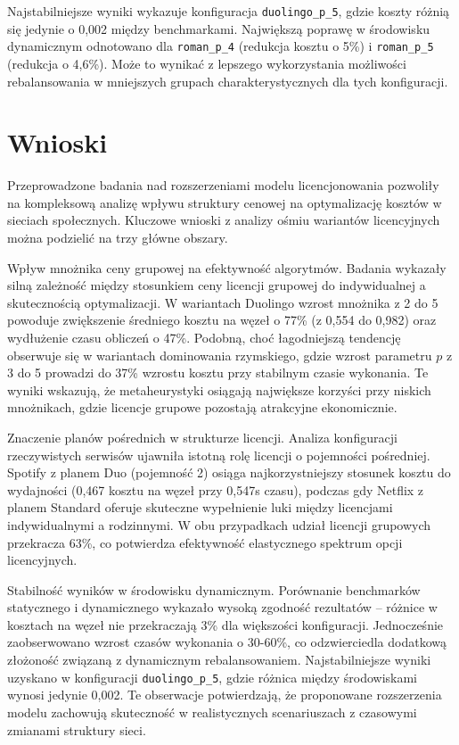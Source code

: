 Najstabilniejsze wyniki wykazuje konfiguracja \texttt{duolingo\_p\_5}, gdzie koszty różnią się jedynie o 0,002 między benchmarkami. Największą poprawę w środowisku dynamicznym odnotowano dla \texttt{roman\_p\_4} (redukcja kosztu o 5\%) i \texttt{roman\_p\_5} (redukcja o 4,6\%). Może to wynikać z lepszego wykorzystania możliwości rebalansowania w mniejszych grupach charakterystycznych dla tych konfiguracji.
\section{Wnioski}

Przeprowadzone badania nad rozszerzeniami modelu licencjonowania pozwoliły na kompleksową analizę wpływu struktury cenowej na optymalizację kosztów w sieciach społecznych. Kluczowe wnioski z analizy ośmiu wariantów licencyjnych można podzielić na trzy główne obszary.

Wpływ mnożnika ceny grupowej na efektywność algorytmów. Badania wykazały silną zależność między stosunkiem ceny licencji grupowej do indywidualnej a skutecznością optymalizacji. W wariantach Duolingo wzrost mnożnika z 2 do 5 powoduje zwiększenie średniego kosztu na węzeł o 77\% (z 0,554 do 0,982) oraz wydłużenie czasu obliczeń o 47\%. Podobną, choć łagodniejszą tendencję obserwuje się w wariantach dominowania rzymskiego, gdzie wzrost parametru $p$ z 3 do 5 prowadzi do 37\% wzrostu kosztu przy stabilnym czasie wykonania. Te wyniki wskazują, że metaheurystyki osiągają największe korzyści przy niskich mnożnikach, gdzie licencje grupowe pozostają atrakcyjne ekonomicznie.

Znaczenie planów pośrednich w strukturze licencji. Analiza konfiguracji rzeczywistych serwisów ujawniła istotną rolę licencji o pojemności pośredniej. Spotify z planem Duo (pojemność 2) osiąga najkorzystniejszy stosunek kosztu do wydajności (0,467 kosztu na węzeł przy 0,547s czasu), podczas gdy Netflix z planem Standard oferuje skuteczne wypełnienie luki między licencjami indywidualnymi a rodzinnymi. W obu przypadkach udział licencji grupowych przekracza 63\%, co potwierdza efektywność elastycznego spektrum opcji licencyjnych.

Stabilność wyników w środowisku dynamicznym. Porównanie benchmarków statycznego i dynamicznego wykazało wysoką zgodność rezultatów -- różnice w kosztach na węzeł nie przekraczają 3\% dla większości konfiguracji. Jednocześnie zaobserwowano wzrost czasów wykonania o 30-60\%, co odzwierciedla dodatkową złożoność związaną z dynamicznym rebalansowaniem. Najstabilniejsze wyniki uzyskano w konfiguracji \texttt{duolingo\_p\_5}, gdzie różnica między środowiskami wynosi jedynie 0,002. Te obserwacje potwierdzają, że proponowane rozszerzenia modelu zachowują skuteczność w realistycznych scenariuszach z czasowymi zmianami struktury sieci.

